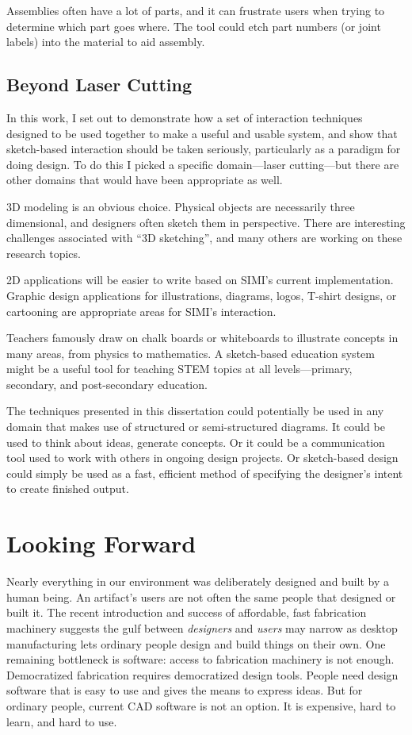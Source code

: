 Assemblies often have a lot of parts, and it can frustrate users when
trying to determine which part goes where. The tool could etch part
numbers (or joint labels) into the material to aid assembly.

\subsection{Beyond Laser Cutting}

In this work, I set out to demonstrate how a set of interaction
techniques designed to be used together to make a useful and usable
system, and show that sketch-based interaction should be taken
seriously, particularly as a paradigm for doing design. To do this I
picked a specific domain---laser cutting---but there are other domains
that would have been appropriate as well. 

3D modeling is an obvious choice. Physical objects are necessarily
three dimensional, and designers often sketch them in
perspective. There are interesting challenges associated with ``3D
sketching'', and many others are working on these research topics.

2D applications will be easier to write based on SIMI's current
implementation. Graphic design applications for illustrations,
diagrams, logos, T-shirt designs, or cartooning are appropriate areas
for SIMI's interaction.

Teachers famously draw on chalk boards or whiteboards to illustrate
concepts in many areas, from physics to mathematics. A sketch-based
education system might be a useful tool for teaching STEM topics at
all levels---primary, secondary, and post-secondary education.

The techniques presented in this dissertation could potentially be used
in any domain that makes use of structured or semi-structured
diagrams. It could be used to think about ideas, generate concepts. Or
it could be a communication tool used to work with others in ongoing
design projects. Or sketch-based design could simply be used as a
fast, efficient method of specifying the designer's intent to create
finished output.

\section{Looking Forward}

Nearly everything in our environment was deliberately designed and
built by a human being. An artifact's users are not often the same
people that designed or built it. The recent introduction and success
of affordable, fast fabrication machinery suggests the gulf between
\textit{designers} and \textit{users} may narrow as desktop
manufacturing lets ordinary people design and build things on their
own. One remaining bottleneck is software: access to fabrication
machinery is not enough. Democratized fabrication requires
democratized design tools. People need design software that is easy to
use and gives the means to express ideas. But for ordinary people,
current CAD software is not an option. It is expensive, hard to learn,
and hard to use.

